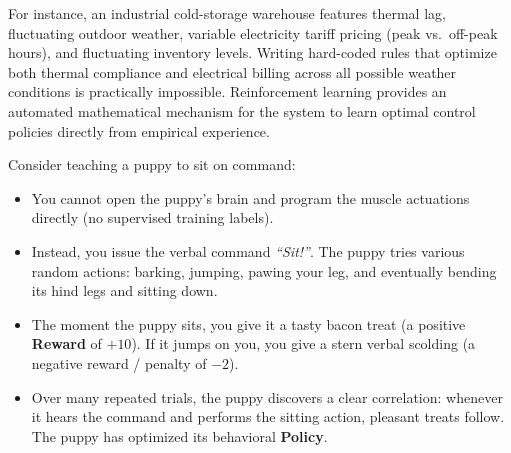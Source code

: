 For instance, an industrial cold-storage warehouse features thermal lag, fluctuating outdoor weather, variable electricity tariff pricing (peak vs.\ off-peak hours), and fluctuating inventory levels. Writing hard-coded rules that optimize both thermal compliance and electrical billing across all possible weather conditions is practically impossible. Reinforcement learning provides an automated mathematical mechanism for the system to learn optimal control policies directly from empirical experience.

\begin{analogy}
Consider teaching a puppy to sit on command:
\begin{itemize}
    \item You cannot open the puppy's brain and program the muscle actuations directly (no supervised training labels).
    \item Instead, you issue the verbal command \emph{``Sit!''}. The puppy tries various random actions: barking, jumping, pawing your leg, and eventually bending its hind legs and sitting down.
    \item The moment the puppy sits, you give it a tasty bacon treat (a positive \textbf{Reward} of $+10$). If it jumps on you, you give a stern verbal scolding (a negative reward / penalty of $-2$).
    \item Over many repeated trials, the puppy discovers a clear correlation: whenever it hears the command and performs the sitting action, pleasant treats follow. The puppy has optimized its behavioral \textbf{Policy}.
\end{itemize}
\end{analogy}

